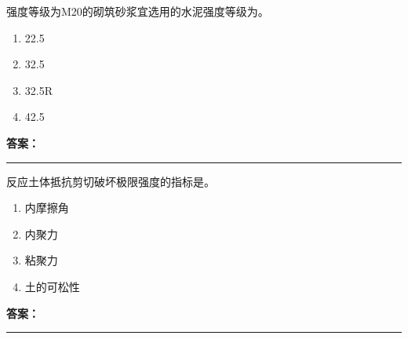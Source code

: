 \documentclass[UTF8,fontset=fandol,11pt]{ctexart}
\newcommand{\answerline}{\textcolor{answerred}{\rule{2.4cm}{0.7pt}}}
\begin{document}
\begin{quizbox}[title={乱序第 235 题｜第六章砌筑工程}]

强度等级为M20的砌筑砂浆宜选用的水泥强度等级为。\\

\begin{enumerate}[label=\Alph*.]

\item 22.5

\item 32.5

\item 32.5R

\item 42.5

\end{enumerate}

\textbf{\textcolor{answerred}{答案：}} \answerline

\end{quizbox}

\vspace{0.2em}

\begin{quizbox}[title={乱序第 236 题｜第一章土方工程}]

反应土体抵抗剪切破坏极限强度的指标是。\\

\begin{enumerate}[label=\Alph*.]

\item 内摩擦角

\item 内聚力

\item 粘聚力

\item 土的可松性

\end{enumerate}

\textbf{\textcolor{answerred}{答案：}} \answerline

\end{quizbox}

\vspace{0.2em}
\end{document}
